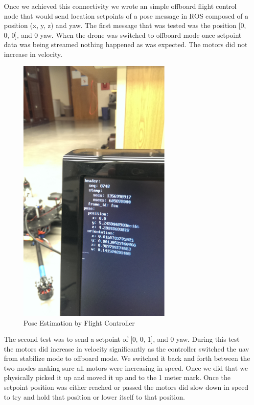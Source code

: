 \begin{itemize}
\begin{itemize}
\noindent Once we achieved this connectivity we wrote an simple offboard flight control node that would send location setpoints of a pose message in ROS composed of a position (x, y, z) and yaw. The first message that was tested was the position [0, 0, 0], and 0 yaw. When the drone was switched to offboard mode once setpoint data was being streamed nothing happened as was expected. The motors did not increase in velocity.\par


\begin{figure}[h]
\includegraphics[width=3in]{images/messages.jpg}
\centering
\caption{Pose Estimation by Flight Controller}
\label{fig:messages}
\end{figure}

\noindent The second test was to send a setpoint of [0, 0, 1], and 0 yaw. During this test the motors did increase in velocity significantly as the controller switched the uav from stabilize mode to offboard mode. We switched it back and forth between the two modes making sure all motors were increasing in speed. Once we did that we physically picked it up and moved it up and to the 1 meter mark. Once the setpoint position was either reached or passed the motors did slow down in speed to try and hold that position or lower itself to that position.\par


\end{itemize}
\end{itemize}
